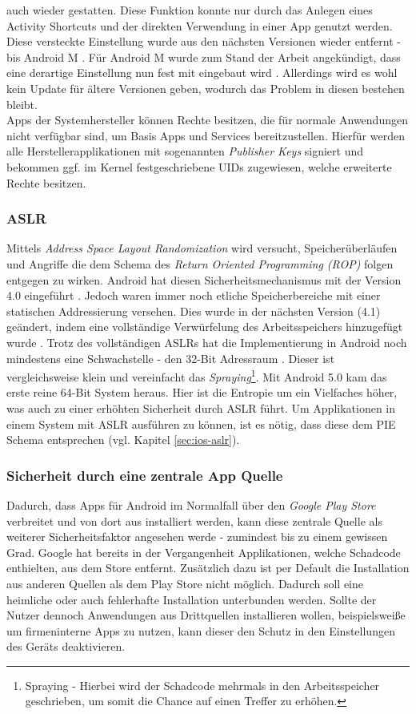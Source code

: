 	auch wieder gestatten. Diese Funktion konnte nur durch das Anlegen
	eines Activity Shortcuts und der direkten Verwendung in einer App genutzt
	werden. Diese versteckte Einstellung wurde aus den nächsten Versionen wieder
	entfernt - bis Android M \cite{HiddenActivity}. Für Android M wurde
	zum Stand der Arbeit angekündigt, dass eine derartige Einstellung nun fest mit
	eingebaut wird \cite{AndroidMPermission}. Allerdings wird es wohl kein
	Update für ältere Versionen geben, wodurch das Problem in diesen bestehen
	bleibt.\\
	Apps der Systemhersteller können Rechte besitzen, die für normale Anwendungen
	nicht verfügbar sind, um Basis Apps und Services bereitzustellen. Hierfür
	werden alle Herstellerapplikationen mit sogenannten \textit{Publisher Keys}
	signiert und bekommen ggf. im Kernel festgeschriebene UIDs zugewiesen, welche
	erweiterte Rechte besitzen.
	
	\subsubsection{ASLR}
	Mittels \textit{Address Space Layout Randomization} wird versucht,
	Speicherüberläufen und Angriffe die dem Schema des \textit{Return Oriented
	Programming (ROP)} folgen entgegen zu wirken. Android hat diesen
	Sicherheitsmechanismus mit der Version 4.0 eingeführt \cite{AslrAndroid}.
	Jedoch waren immer noch etliche Speicherbereiche mit einer statischen
	Addressierung versehen. Dies wurde in der nächsten Version (4.1) geändert,
	indem eine vollständige Verwürfelung des Arbeitsspeichers hinzugefügt wurde
	\cite{BetterAslrAndroid}. Trotz des vollständigen ASLRs hat die
	Implementierung in Android noch mindestens eine Schwachstelle - den 32-Bit
	Adressraum \cite{AslrAndroid32}. Dieser ist vergleichsweise klein und
	vereinfacht das \textit{Spraying}\footnote{Spraying - Hierbei wird der
	Schadcode mehrmals in den Arbeitsspeicher geschrieben, um somit die Chance auf
	einen Treffer zu erhöhen.}. Mit Android 5.0 kam das erste reine 64-Bit System
	heraus. Hier ist die Entropie um ein Vielfaches höher, was auch zu einer
	erhöhten Sicherheit durch ASLR führt. Um Applikationen in einem System mit
	ASLR ausführen zu können, ist es nötig, dass diese dem PIE Schema entsprechen
	(vgl. Kapitel \ref{sec:ios-aslr}).
	
	
	\subsubsection{Sicherheit durch eine zentrale App Quelle}
	Dadurch, dass Apps für Android im Normalfall über den \textit{Google Play
	Store} verbreitet und von dort aus installiert werden, kann diese zentrale
	Quelle als weiterer Sicherheitsfaktor angesehen werde - zumindest bis zu einem
	gewissen Grad. Google hat bereits in der Vergangenheit Applikationen, welche
	Schadcode enthielten, aus dem Store entfernt. Zusätzlich dazu ist per Default
	die Installation aus anderen Quellen als dem Play Store nicht möglich. Dadurch
	soll eine heimliche oder auch fehlerhafte Installation unterbunden werden.
	Sollte der Nutzer dennoch Anwendungen aus Drittquellen installieren wollen,
	beispielsweiße um firmeninterne Apps zu nutzen, kann dieser den
	Schutz in den Einstellungen des Geräts deaktivieren.
